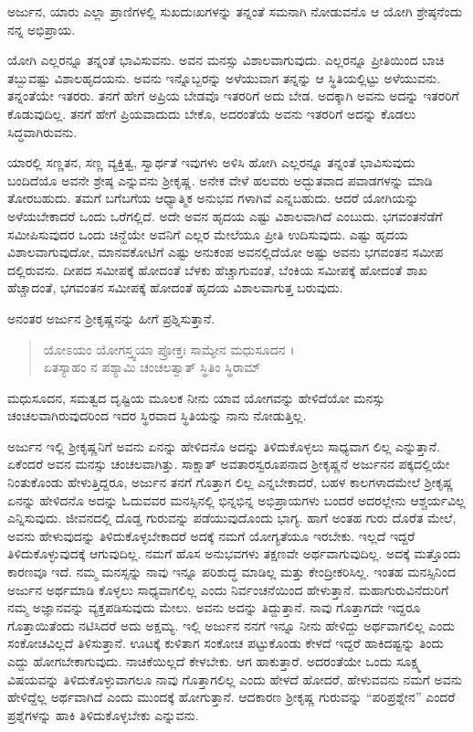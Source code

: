 {\small ಅರ್ಜುನ, ಯಾರು ಎಲ್ಲಾ ಪ್ರಾಣಿಗಳಲ್ಲಿ ಸುಖದುಃಖಗಳನ್ನು ತನ್ನಂತೆ ಸಮನಾಗಿ ನೋಡುವನೊ ಆ ಯೋಗಿ ಶ್ರೇಷ್ಠನೆಂದು ನನ್ನ ಅಭಿಪ್ರಾಯ.}

ಯೋಗಿ ಎಲ್ಲರನ್ನೂ ತನ್ನಂತೆ ಭಾವಿಸುವನು. ಅವನ ಮನಸ್ಸು ವಿಶಾಲವಾಗುವುದು. ಎಲ್ಲರನ್ನೂ ಪ್ರೀತಿಯಿಂದ ಬಾಚಿ ತಬ್ಬುವಷ್ಟು ವಿಶಾಲಹೃದಯನು. ಅವನು ಇನ್ನೊಬ್ಬರನ್ನು ಅಳೆಯುವಾಗ ತನ್ನನ್ನು ಆ ಸ್ಥಿತಿಯಲ್ಲಿಟ್ಟು ಅಳೆಯುವನು. ತನ್ನಂತೆಯೇ ಇತರರು. ತನಗೆ ಹೇಗೆ ಅಪ್ರಿಯ ಬೇಡವೊ ಇತರರಿಗೆ ಅದು ಬೇಡ. ಅದಕ್ಕಾಗಿ ಅವನು ಅದನ್ನು ಇತರರಿಗೆ ಕೊಡುವುದಿಲ್ಲ. ತನಗೆ ಹೇಗೆ ಪ್ರಿಯವಾದುದು ಬೇಕೊ, ಅದರಂತೆಯೆ ಅವನು ಇತರರಿಗೆ ಅದನ್ನು ಕೊಡಲು ಸಿದ್ಧವಾಗಿರುವನು.

ಯಾರಲ್ಲಿ ಸಣ್ಣತನ, ಸಣ್ಣ ವ್ಯಕ್ತಿತ್ವ, ಸ್ವಾರ್ಥತೆ ಇವುಗಳು ಅಳಿಸಿ ಹೋಗಿ ಎಲ್ಲರನ್ನೂ ತನ್ನಂತೆ ಭಾವಿಸುವುದು ಬಂದಿದೆಯೊ ಅವನೇ ಶ್ರೇಷ್ಠ ಎನ್ನುವನು ಶ್ರೀಕೃಷ್ಣ. ಅನೇಕ ವೇಳೆ ಹಲವರು ಅದ್ಭುತವಾದ ಪವಾಡಗಳನ್ನು ಮಾಡಿ ತೋರಬಹುದು. ತಮಗೆ ಬಗೆಬಗೆಯ ಆಧ್ಯಾತ್ಮಿಕ ಅನುಭವ ಗಳಾಗಿವೆ ಎನ್ನಬಹುದು. ಆದರೆ ಯೋಗಿಯನ್ನು ಅಳೆಯಬೇಕಾದರೆ ಒಂದು ಒರೆಗಲ್ಲಿದೆ. ಅದೇ ಅವನ ಹೃದಯ ಎಷ್ಟು ವಿಶಾಲವಾಗಿದೆ ಎಂಬುದು. ಭಗವಂತನೆಡೆಗೆ ಸಮೀಪಿಸುವುದರ ಒಂದು ಚಿನ್ಹೆಯೇ ಅವನಿಗೆ ಎಲ್ಲರ ಮೇಲೆಯೂ ಪ್ರೀತಿ ಉದಿಸುವುದು. ಎಷ್ಟು ಹೃದಯ ವಿಶಾಲವಾಗುವುದೋ, ಮಾನವಕೋಟಿಗೆ ಎಷ್ಟು ಅನುಕಂಪ ಅವನಲ್ಲಿದೆಯೋ ಅಷ್ಟು ಅವನು ಭಗವಂತನ ಸಮೀಪ ದಲ್ಲಿರುವನು. ದೀಪದ ಸಮೀಪಕ್ಕೆ ಹೋದಂತೆ ಬೆಳಕು ಹೆಚ್ಚಾಗುವಂತೆ, ಬೆಂಕಿಯ ಸಮೀಪಕ್ಕೆ ಹೋದಂತೆ ಶಾಖ ಹೆಚ್ಚಾದಂತೆ, ಭಗವಂತನ ಸಮೀಪಕ್ಕೆ ಹೋದಂತೆ ಹೃದಯ ವಿಶಾಲವಾಗುತ್ತ ಬರುವುದು.

ಅನಂತರ ಅರ್ಜುನ ಶ್ರೀಕೃಷ್ಣನನ್ನು ಹೀಗೆ ಪ್ರಶ್ನಿಸುತ್ತಾನೆ.

\begin{verse}
ಯೋಽಯಂ ಯೋಗಸ್ತ್ವಯಾ ಪ್ರೋಕ್ತಃ ಸಾಮ್ಯೇನ ಮಧುಸೂದನ ।\\ಏತಸ್ಯಾಹಂ ನ ಪಶ್ಯಾಮಿ ಚಂಚಲತ್ವಾತ್ ಸ್ಥಿತಿಂ ಸ್ಥಿರಾಮ್ 
\end{verse}

{\small ಮಧುಸೂದನ, ಸಮತ್ವದ ದೃಷ್ಟಿಯ ಮೂಲಕ ನೀನು ಯಾವ ಯೋಗವನ್ನು ಹೇಳಿದೆಯೋ ಮನಸ್ಸು ಚಂಚಲವಾಗಿರುವುದರಿಂದ ಇದರ ಸ್ಥಿರವಾದ ಸ್ಥಿತಿಯನ್ನು ನಾನು ನೋಡುತ್ತಿಲ್ಲ.}

ಅರ್ಜುನ ಇಲ್ಲಿ ಶ್ರೀಕೃಷ್ಣನಿಗೆ ಅವನು ಏನನ್ನು ಹೇಳಿದನೊ ಅದನ್ನು ತಿಳಿದುಕೊಳ್ಳಲು ಸಾಧ್ಯವಾಗ ಲಿಲ್ಲ ಎನ್ನುತ್ತಾನೆ. ಏಕೆಂದರೆ ಅವನ ಮನಸ್ಸು ಚಂಚಲವಾಗಿತ್ತು. ಸಾಕ್ಷಾತ್ ಅವತಾರಸ್ವರೂಪನಾದ ಶ್ರೀಕೃಷ್ಣನೆ ಅರ್ಜುನನ ಪಕ್ಕದಲ್ಲಿಯೇ ನಿಂತುಕೊಂಡು ಹೇಳುತ್ತಿದ್ದರೂ, ಅರ್ಜುನ ತನಗೆ ಗೊತ್ತಾಗ ಲಿಲ್ಲ ಎನ್ನಬೇಕಾದರೆ, ಬಹಳ ಕಾಲಗಳಾದಮೇಲೆ ಶ್ರೀಕೃಷ್ಣ ಏನನ್ನು ಹೇಳಿದನೊ ಅದನ್ನು ಓದುವವರ ಮನಸ್ಸಿನಲ್ಲಿ ಭಿನ್ನಭಿನ್ನ ಅಭಿಪ್ರಾಯಗಳು ಬಂದರೆ ಅದರಲ್ಲೇನು ಆಶ್ಚರ್ಯವಿಲ್ಲ ಎನ್ನಿಸುವುದು. ಜೀವನದಲ್ಲಿ ದೊಡ್ಡ ಗುರುವನ್ನು ಪಡೆಯುವುದೊಂದು ಭಾಗ್ಯ. ಹಾಗೆ ಅಂತಹ ಗುರು ದೊರೆತ ಮೇಲೆ, ಅವನು ಹೇಳುವುದನ್ನು ತಿಳಿದುಕೊಳ್ಳಬೇಕಾದರೆ ಅದಕ್ಕೆ ನಮಗೆ ಯೋಗ್ಯತೆಯೂ ಇರಬೇಕು. ಇಲ್ಲದೆ ಇದ್ದರೆ ತಿಳಿದುಕೊಳ್ಳುವುದಕ್ಕೆ ಆಗುವುದಿಲ್ಲ. ನಮಗೆ ಹೊಸ ಅನುಭವಗಳು ತಕ್ಷಣವೇ ಅರ್ಥವಾಗುವುದಿಲ್ಲ. ಅದಕ್ಕೆ ಮತ್ತೊಂದು ಕಾರಣವೂ ಇದೆ. ನಮ್ಮ ಮನಸ್ಸನ್ನು ನಾವು ಇನ್ನೂ ಪರಿಶುದ್ಧ ಮಾಡಿಲ್ಲ ಮತ್ತು ಕೇಂದ್ರೀಕರಿಸಿಲ್ಲ. ಇಂತಹ ಮನಸ್ಸಿನಿಂದ ಅರ್ಜುನ ಅರ್ಥಮಾಡಿ ಕೊಳ್ಳಲು ಸಾಧ್ಯವಾಗಲಿಲ್ಲ ಎಂದು ನಿರ್ವಂಚನೆಯಿಂದ ಹೇಳುತ್ತಾನೆ. ಮಹಾಗುರುವಿನೆದುರಿಗೆ ನಮ್ಮ ಅಜ್ಞಾನವನ್ನು ವ್ಯಕ್ತಪಡಿಸುವುದು ಮೇಲು. ಅವನು ಅದನ್ನು ತಿದ್ದುತ್ತಾನೆ. ನಾವು ಗೊತ್ತಾಗದೇ ಇದ್ದರೂ ಗೊತ್ತಾಯಿತೆಂದು ನಟಿಸಿದರೆ ಅದು ಅಕ್ಷಮ್ಯ. ಇಲ್ಲಿ ಅರ್ಜುನ ನನಗೆ ಇನ್ನೂ ನೀನು ಹೇಳಿದ್ದು ಅರ್ಥವಾಗಲಿಲ್ಲ ಎಂದು ಸಂಕೋಚವಿಲ್ಲದೆ ತಿಳಿಸುತ್ತಾನೆ. ಊಟಕ್ಕೆ ಕುಳಿತಾಗ ಸಂಕೋಚ ಪಟ್ಟುಕೊಂಡು ಕೇಳದೆ ಇದ್ದರೆ ಹಾಕಿದಷ್ಟನ್ನು ತಿಂದು ಎದ್ದು ಹೋಗಬೇಕಾಗುವುದು. ನಾಚಿಕೆಯಿಲ್ಲದೆ ಕೇಳಬೇಕು. ಆಗ ಹಾಕುತ್ತಾರೆ. ಅದರಂತೆಯೇ ಒಂದು ಸೂಕ್ಷ್ಮ ವಿಷಯವನ್ನು ತಿಳಿದುಕೊಳ್ಳುವಾಗಲೂ ನಾವು ಗೊತ್ತಾಗಲಿಲ್ಲ ಎಂದು ಹೇಳದೆ ಹೋದರೆ, ಹೇಳುವವನು ನಮಗೆ ಅವನು ಹೇಳಿದ್ದೆಲ್ಲ ಅರ್ಥವಾಗಿದೆ ಎಂದು ಮುಂದಕ್ಕೆ ಹೋಗುತ್ತಾನೆ. ಆದಕಾರಣ ಶ್ರೀಕೃಷ್ಣ ಗುರುವನ್ನು “ಪರಿಪ್ರಶ್ನೇನ” ಎಂದರೆ ಪ್ರಶ್ನೆಗಳನ್ನು ಹಾಕಿ ತಿಳಿದುಕೊಳ್ಳಬೇಕು ಎನ್ನುವನು.

